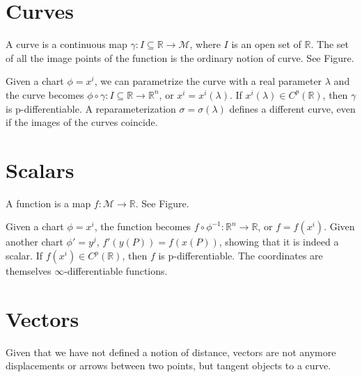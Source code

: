 \section{Curves}

    \begin{definition}[Curve]
        A curve is a continuous map $\gamma \colon I \subseteq \mathbb R \rightarrow \mathcal M$, where $I$ is an open set of $\mathbb R$. The set of all the image points of the function is the ordinary notion of curve. See Figure.
    \end{definition} 
    \noindent Given a chart $\phi = x^i$, we can parametrize the curve with a real parameter $\lambda$ and the curve becomes $\phi \circ \gamma \colon I \subseteq \mathbb R \rightarrow \mathbb R^n$, or $x^i = x^i(\lambda)$. If $x^i(\lambda) \in C^p(\mathbb R)$, then $\gamma$ is p-differentiable. A reparameterization $\sigma = \sigma(\lambda)$ defines a different curve, even if the images of the curves coincide.

\section{Scalars}

    \begin{definition}
        A function is a map $f \colon \mathcal M \rightarrow \mathbb R$. See Figure.
    \end{definition} 
    \noindent Given a chart $\phi = x^i$, the function becomes $f \circ \phi^{-1} \colon \mathbb R^n \rightarrow \mathbb R$, or $f = f(x^i)$. Given another chart $\phi' = y^j$, $f'(y(P)) = f(x(P))$, showing that it is indeed a scalar. If $f(x^i) \in C^p(\mathbb R)$, then $f$ is p-differentiable. The coordinates are themselves $\infty$-differentiable functions.

\section{Vectors}

    Given that we have not defined a notion of distance, vectors are not anymore displacements or arrows between two points, but tangent objects to a curve.

